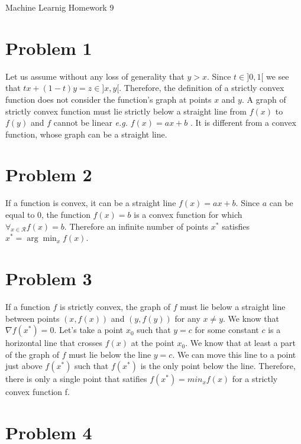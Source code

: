 \documentclass[12pt]{article}
\begin{document}
\begin{center}
{\Large Machine Learnig Homework 9} \\[.3in]
\end{center}
\vspace*{.5in}


\section*{Problem 1}

Let us assume without any loss of generality that $y > x$. Since $t \in ]0, 1[$ we see that $tx + (1-t)y = z \in ]x, y[$. Therefore, the definition of a strictly convex function does not consider the function's graph at points $x$ and $y$. A graph of strictly convex function must lie strictly below a straight line from $f(x)$ to $f(y)$ and $f$ cannot be linear \emph{e.g.} $f(x) = ax + b$ . It is different from a convex function, whose graph can be a straight line.

\section*{Problem 2}

If a function is convex, it can be a straight line $f(x) = ax + b$. Since $a$ can be equal to $0$, the function $f(x) = b$ is a convex function for which $\forall_{x \in \mathcal{R}} f(x) = b$. Therefore an infinite number of points $x^*$ satisfies $x^* = \arg \min_x f(x)$.

\section*{Problem 3}

If a function $f$ is strictly convex, the graph of $f$ must lie below a straight line between points $(x, f(x))$ and $(y, f(y))$ for any $x \neq y$. We know that $\nabla f(x^*) = 0$. Let's take a point $x_0$ such that $y = c$ for some constant $c$ is a horizontal line that crosses $f(x)$ at the point $x_0$. We know that at least a part of the graph of $f$ must lie below the line $y = c$. We can move this line to a point just above $f(x^*)$ such that $f(x^*)$ is the only point below the line. Therefore, there is only a single point that satifies $f(x^*) = min_x f(x)$ for a strictly convex function f.

\section*{Problem 4}
\end{document}
